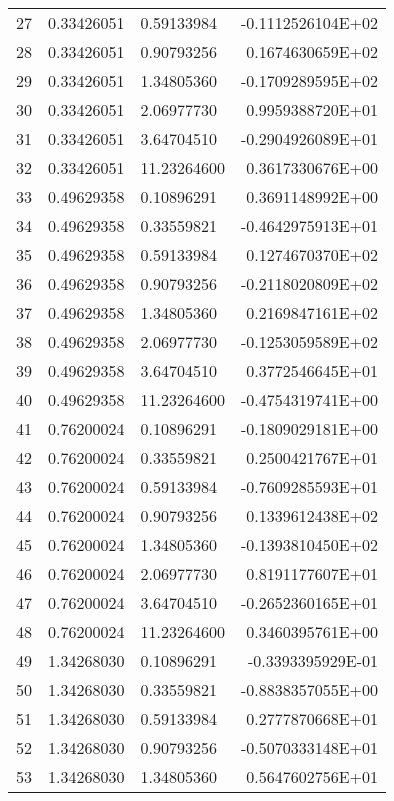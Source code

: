 \begin{longtable}{@{\extracolsep{\fill}}cllr@{}}
27  &  0.33426051  &  0.59133984  &  -0.1112526104E+02 \\
28  &  0.33426051  &  0.90793256  &   0.1674630659E+02 \\
29  &  0.33426051  &  1.34805360  &  -0.1709289595E+02 \\
30  &  0.33426051  &  2.06977730  &   0.9959388720E+01 \\
31  &  0.33426051  &  3.64704510  &  -0.2904926089E+01 \\
32  &  0.33426051  &  11.23264600  &   0.3617330676E+00 \\
33  &  0.49629358  &  0.10896291  &   0.3691148992E+00 \\
34  &  0.49629358  &  0.33559821  &  -0.4642975913E+01 \\
35  &  0.49629358  &  0.59133984  &   0.1274670370E+02 \\
36  &  0.49629358  &  0.90793256  &  -0.2118020809E+02 \\
37  &  0.49629358  &  1.34805360  &   0.2169847161E+02 \\
38  &  0.49629358  &  2.06977730  &  -0.1253059589E+02 \\
39  &  0.49629358  &  3.64704510  &   0.3772546645E+01 \\
40  &  0.49629358  &  11.23264600  &  -0.4754319741E+00 \\
41  &  0.76200024  &  0.10896291  &  -0.1809029181E+00 \\
42  &  0.76200024  &  0.33559821  &   0.2500421767E+01 \\
43  &  0.76200024  &  0.59133984  &  -0.7609285593E+01 \\
44  &  0.76200024  &  0.90793256  &   0.1339612438E+02 \\
45  &  0.76200024  &  1.34805360  &  -0.1393810450E+02 \\
46  &  0.76200024  &  2.06977730  &   0.8191177607E+01 \\
47  &  0.76200024  &  3.64704510  &  -0.2652360165E+01 \\
48  &  0.76200024  &  11.23264600  &   0.3460395761E+00 \\
49  &  1.34268030  &  0.10896291  &  -0.3393395929E-01 \\
50  &  1.34268030  &  0.33559821  &  -0.8838357055E+00 \\
51  &  1.34268030  &  0.59133984  &   0.2777870668E+01 \\
52  &  1.34268030  &  0.90793256  &  -0.5070333148E+01 \\
53  &  1.34268030  &  1.34805360  &   0.5647602756E+01 \\

\end{longtable}

